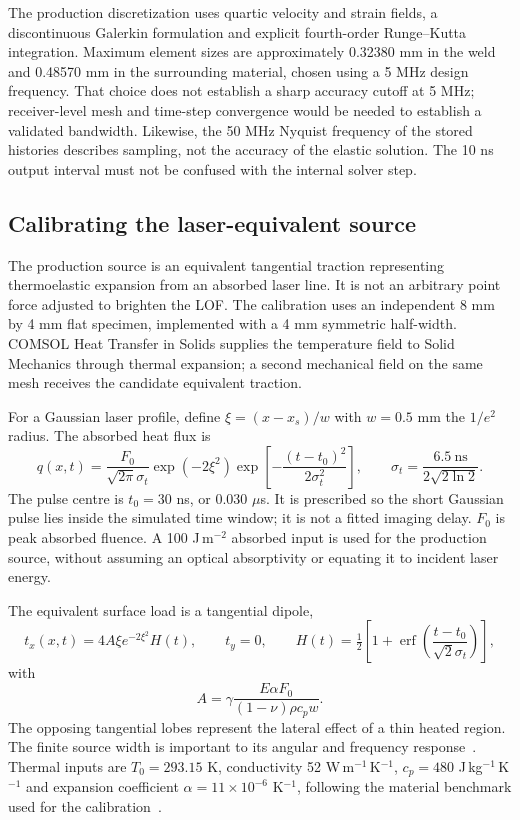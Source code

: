 \documentclass[11pt]{article}
\begin{document}
The production discretization uses quartic velocity and strain fields, a discontinuous Galerkin formulation and explicit fourth-order Runge--Kutta integration. Maximum element sizes are approximately 0.32380 mm in the weld and 0.48570 mm in the surrounding material, chosen using a 5 MHz design frequency. That choice does not establish a sharp accuracy cutoff at 5 MHz; receiver-level mesh and time-step convergence would be needed to establish a validated bandwidth. Likewise, the 50 MHz Nyquist frequency of the stored histories describes sampling, not the accuracy of the elastic solution. The 10 ns output interval must not be confused with the internal solver step.

\subsection{Calibrating the laser-equivalent source}
\label{saft:calibration}
The production source is an equivalent tangential traction representing thermoelastic expansion from an absorbed laser line. It is not an arbitrary point force adjusted to brighten the LOF. The calibration uses an independent 8 mm by 4 mm flat specimen, implemented with a 4 mm symmetric half-width. COMSOL Heat Transfer in Solids supplies the temperature field to Solid Mechanics through thermal expansion; a second mechanical field on the same mesh receives the candidate equivalent traction.

For a Gaussian laser profile, define $\xi=(x-x_s)/w$ with $w=0.5$ mm the $1/e^2$ radius. The absorbed heat flux is
\begin{equation}
 q(x,t)=\frac{F_0}{\sqrt{2\pi}\sigma_t}
 \exp(-2\xi^2)\exp\!\left[-\frac{(t-t_0)^2}{2\sigma_t^2}\right],
 \qquad \sigma_t=\frac{6.5\ \mathrm{ns}}{2\sqrt{2\ln2}}.
\end{equation}
The pulse centre is $t_0=30$ ns, or 0.030 $\mu$s. It is prescribed so the short Gaussian pulse lies inside the simulated time window; it is not a fitted imaging delay. $F_0$ is peak absorbed fluence. A 100 J\,m$^{-2}$ absorbed input is used for the production source, without assuming an optical absorptivity or equating it to incident laser energy.

The equivalent surface load is a tangential dipole,
\begin{equation}
 t_x(x,t)=4A\xi e^{-2\xi^2}H(t),\qquad t_y=0,
 \qquad H(t)=\tfrac12\left[1+\operatorname{erf}\!\left(\frac{t-t_0}{\sqrt2\sigma_t}\right)\right],
\end{equation}
with
\begin{equation}
 A=\gamma\frac{E\alpha F_0}{(1-\nu)\rho c_p w}.
\end{equation}
The opposing tangential lobes represent the lateral effect of a thin heated region. The finite source width is important to its angular and frequency response~\cite{tu}. Thermal inputs are $T_0=293.15$ K, conductivity 52 W\,m$^{-1}$\,K$^{-1}$, $c_p=480$ J\,kg$^{-1}$\,K$^{-1}$ and expansion coefficient $\alpha=11\times10^{-6}$ K$^{-1}$, following the material benchmark used for the calibration~\cite{dolz-2024}.
\end{document}
